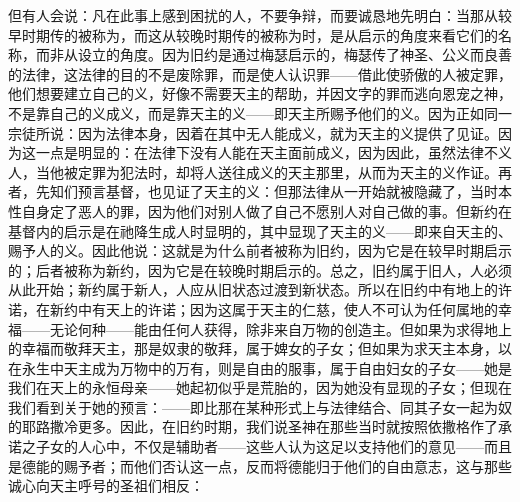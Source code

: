 但有人会说：凡在此事上感到困扰的人，不要争辩，而要诚恳地先明白：当那从较早时期传的被称为，而这从较晚时期传的被称为时，是从启示的角度来看它们的名称，而非从设立的角度。因为旧约是通过梅瑟启示的，梅瑟传了神圣、公义而良善的法律，这法律的目的不是废除罪，而是使人认识罪——借此使骄傲的人被定罪，他们想要建立自己的义，好像不需要天主的帮助，并因文字的罪而逃向恩宠之神，不是靠自己的义成义，而是靠天主的义——即天主所赐予他们的义。因为正如同一宗徒所说：因为法律本身，因着在其中无人能成义，就为天主的义提供了见证。因为这一点是明显的：在法律下没有人能在天主面前成义，因为因此，虽然法律不义人，当他被定罪为犯法时，却将人送往成义的天主那里，从而为天主的义作证。再者，先知们预言基督，也见证了天主的义：但那法律从一开始就被隐藏了，当时本性自身定了恶人的罪，因为他们对别人做了自己不愿别人对自己做的事。但新约在基督内的启示是在祂降生成人时显明的，其中显现了天主的义——即来自天主的、赐予人的义。因此他说：这就是为什么前者被称为旧约，因为它是在较早时期启示的；后者被称为新约，因为它是在较晚时期启示的。总之，旧约属于旧人，人必须从此开始；新约属于新人，人应从旧状态过渡到新状态。所以在旧约中有地上的许诺，在新约中有天上的许诺；因为这属于天主的仁慈，使人不可认为任何属地的幸福——无论何种——能由任何人获得，除非来自万物的创造主。但如果为求得地上的幸福而敬拜天主，那是奴隶的敬拜，属于婢女的子女；但如果为求天主本身，以在永生中天主成为万物中的万有，则是自由的服事，属于自由妇女的子女——她是我们在天上的永恒母亲——她起初似乎是荒胎的，因为她没有显现的子女；但现在我们看到关于她的预言：——即比那在某种形式上与法律结合、同其子女一起为奴的耶路撒冷更多。因此，在旧约时期，我们说圣神在那些当时就按照依撒格作了承诺之子女的人心中，不仅是辅助者——这些人认为这足以支持他们的意见——而且是德能的赐予者；而他们否认这一点，反而将德能归于他们的自由意志，这与那些诚心向天主呼号的圣祖们相反：\par


